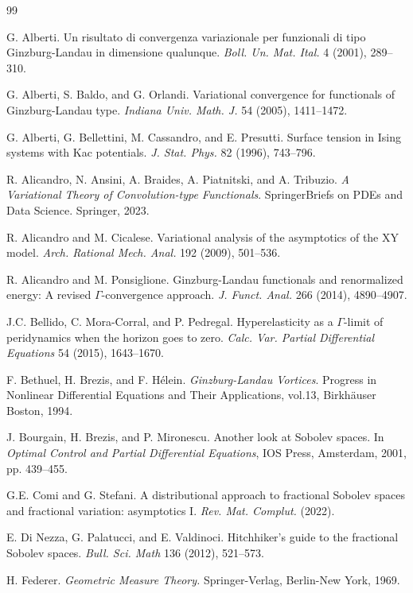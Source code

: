 \documentclass[11pt]{article}
\begin{document}
\begin{thebibliography}{99}

 G. Alberti. Un risultato di convergenza variazionale per funzionali di tipo Ginzburg-Landau in dimensione qualunque. {\em Boll. Un. Mat. Ital.} 4 (2001), 289--310.

 G. Alberti, S. Baldo, and G. Orlandi. Variational convergence for functionals of Ginzburg-Landau type. {\em Indiana Univ. Math. J.}  54 (2005), 1411--1472.

 G. Alberti, G. Bellettini, M. Cassandro, and E. Presutti. 
Surface tension in Ising systems with Kac potentials. {\em J. Stat. Phys.} 82 (1996), 743--796.

 R. Alicandro, N. Ansini, A. Braides, A. Piatnitski, and A. Tribuzio. {\em A Variational Theory of Convolution-type Functionals}. SpringerBriefs on PDEs and Data Science. Springer, 2023.

 R. Alicandro and M. Cicalese. Variational analysis of the asymptotics of the XY model. {\em Arch. Rational Mech. Anal.} 192 (2009), 501--536. 

 R. Alicandro and M. Ponsiglione. Ginzburg-Landau functionals and renormalized energy: A revised $\Gamma$-convergence approach. {\em J. Funct. Anal.} 266 (2014), 4890--4907.

 J.C. Bellido, C. Mora-Corral, and P. Pedregal. Hyperelasticity as a $\Gamma$-limit of peridynamics when the horizon goes to zero. {\em Calc. Var. Partial Differential Equations} 54 (2015), 1643--1670.

 F. Bethuel, H. Brezis, and F. H\'elein. {\em Ginzburg-Landau Vortices}. Progress in Nonlinear Differential Equations and Their Applications, vol.13, Birkh\"auser Boston, 1994.

 J. Bourgain, H. Brezis, and P. Mironescu. Another look at Sobolev spaces. In {\em Optimal Control and Partial Differential Equations}, IOS Press, Amsterdam, 2001, pp. 439--455.

 G.E. Comi and G. Stefani. A distributional approach to fractional Sobolev spaces and fractional variation: asymptotics I. {\em Rev. Mat. Complut.} (2022).

 E. Di Nezza, G. Palatucci, and E. Valdinoci. Hitchhiker's guide to the fractional Sobolev spaces. {\em Bull. Sci. Math} 136 (2012), 521--573.

 H. Federer. {\em Geometric Measure Theory.} Springer-Verlag, Berlin-New York, 1969. 


\end{thebibliography}
\end{document}
